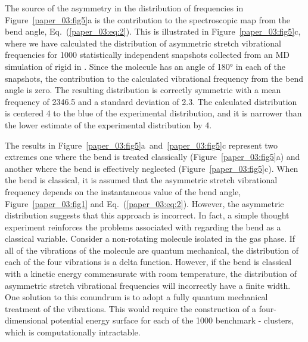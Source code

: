 \documentclass[%
  class = book,%
  crop = false,%
  float = true,%
  multi = true,%
  preview = false,%
]{standalone}
\begin{document}
The source of the asymmetry in the distribution of frequencies in Figure~\ref{paper_03:fig5}a is the contribution to the spectroscopic map from the  bend angle, Eq.~(\ref{paper_03:eq:2}). This is illustrated in Figure~\ref{paper_03:fig5}c, where we have calculated the distribution of  asymmetric stretch vibrational frequencies for \num{1000} statistically independent snapshots collected from an MD simulation of rigid  in \ce{[C4C1im][PF6]}. Since the  molecule has an angle of \ang{180} in each of the snapshots, the contribution to the calculated vibrational frequency from the  bend angle is zero. The resulting distribution is correctly symmetric with a mean frequency of \SI{2346.5}{\wavenumber} and a standard deviation of \SI{2.3}{\wavenumber}. The calculated distribution is centered \SI{4}{\wavenumber} to the blue of the experimental distribution, and it is narrower than the lower estimate of the experimental distribution by \SI{4}{\wavenumber}.

The results in Figure~\ref{paper_03:fig5}a~and~\ref{paper_03:fig5}c represent two extremes \textemdash{} one where the  bend is treated classically (Figure~\ref{paper_03:fig5}a) and another where the  bend is effectively neglected (Figure~\ref{paper_03:fig5}c). When the  bend is classical, it is assumed that the  asymmetric stretch vibrational frequency depends on the instantaneous value of the bend angle, Figure~\ref{paper_03:fig1} and Eq.~(\ref{paper_03:eq:2}). However, the asymmetric distribution suggests that this approach is incorrect. In fact, a simple thought experiment reinforces the problems associated with regarding the  bend as a classical variable. Consider a non-rotating  molecule isolated in the gas phase. If all of the vibrations of the  molecule are quantum mechanical, the distribution of each of the four vibrations is a delta function. However, if the bend is classical with a kinetic energy commensurate with room temperature, the distribution of asymmetric stretch vibrational frequencies will incorrectly have a finite width. One solution to this conundrum is to adopt a fully quantum mechanical treatment of the  vibrations. This would require the construction of a four-dimensional potential energy surface for each of the \num{1000} benchmark -\ce{[C4C1im][PF6]} clusters, which is computationally intractable.
\end{document}
